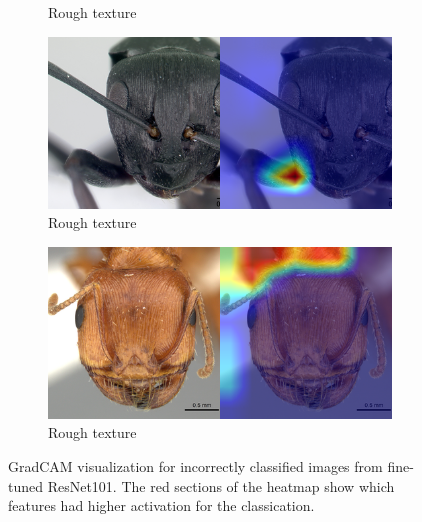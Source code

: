 \documentclass{aci}
\numberwithin{equation}{section}
\begin{document}
\begin{figure}
\begin{subfigure}{\subwidth}
        \caption*{Rough texture}
        \label{fig:incorrect_nonideal_22}
    \end{subfigure}
    \begin{subfigure}{\subwidth}
        \includegraphics[width=1\linewidth]{thesis_assets/gradcam/incorrect_nonideal/61.png}
        \caption*{Rough texture}
        \label{fig:incorrect_nonideal_61}
    \end{subfigure}
    \begin{subfigure}{\subwidth}
        \includegraphics[width=1\linewidth]{thesis_assets/gradcam/incorrect_nonideal/204.png}
        \caption*{Rough texture}
        \label{fig:incorrect_nonideal_204}
    \end{subfigure}
    \caption{GradCAM visualization for incorrectly classified images from
        fine-tuned ResNet101. The red sections of the heatmap show which features
        had higher activation for the classication.}
    \label{fig:incorrect_images}
\end{figure}
\end{document}
